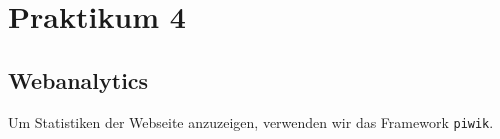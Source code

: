 \section{Praktikum 4}

\subsection{Webanalytics}
Um Statistiken der Webseite anzuzeigen, verwenden wir das Framework \texttt{piwik}. 
